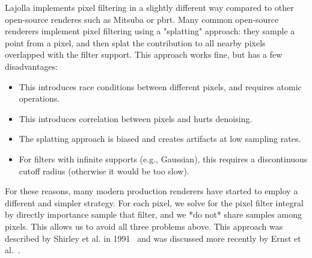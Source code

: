 Lajolla implements pixel filtering in a slightly different way compared to other open-source renderes such as Mitsuba or pbrt. Many common open-source renderers implement pixel filtering using a "splatting" approach: they sample a point from a pixel, and then splat the contribution to all nearby pixels overlapped with the filter support. This approach works fine, but has a few disadvantages:
\begin{itemize}
    \item This introduces race conditions between different pixels, and requires atomic operations.
    \item This introduces correlation between pixels and hurts denoising.
    \item The splatting approach is biased and creates artifacts at low sampling rates.
    \item For filters with infinite supports (e.g., Gaussian), this requires a discontinuous cutoff radius (otherwise it would be too slow).
\end{itemize}
For these reasons, many modern production renderers have started to employ a different and simpler strategy. For each pixel, we solve for the pixel filter integral by directly importance sample that filter, and we *do not* share samples among pixels. This allows us to avoid all three problems above. This approach was described by Shirley et al. in 1991~\cite{Shirley:1991:RTF} and was discussed more recently by Ernst et al.~\cite{Ernst:2006:FIS}.

